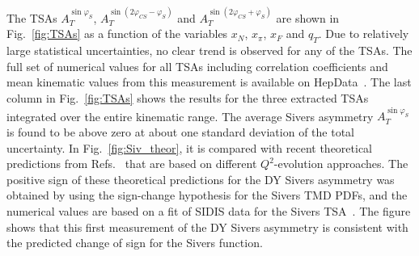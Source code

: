 \documentclass[a4paper,manyauthors,nocleardouble,COMPASS]{cernphprep}
\newcommand{\phiCS}{\varphi _{CS}}
\newcommand{\phiS}{\varphi _S}
\newcommand{\gvc}{GeV/$c$}
\newcommand{\gvcw}{GeV/$c^2$}
\begin{document}
The TSAs $A_T^{\sin\phiS}$, $A_T^{\sin(2\phiCS-\phiS)}$ and $A_T^{\sin(2\phiCS+\phiS)}$ are shown in Fig.~\ref{fig:TSAs} as a function of the variables $x_{N}$, $x_{\pi}$, $x_{F}$ and $q_{T}$.
Due to relatively large statistical uncertainties, no clear trend is observed for any of the TSAs.
The full set of numerical values for all TSAs including correlation coefficients and mean kinematic values from this measurement is available on HepData~\cite{hepdata}.
%
%
The last column in Fig.~\ref{fig:TSAs} shows the results for the three extracted TSAs integrated over the entire kinematic range.
The average Sivers asymmetry $A_T^{\sin\phiS}$ is found to be above zero at about one standard deviation of the total uncertainty. In Fig.~\ref{fig:Siv_theor}, it is compared with recent theoretical predictions from Refs.~\cite{Anselmino:2016uie,Echevarria:2014xaa,Sun:2013hua} that are based on different $Q^2$-evolution approaches. The positive sign of these theoretical predictions for the DY Sivers asymmetry was obtained by using the sign-change hypothesis for the Sivers TMD PDFs, and the numerical values are based on a fit of SIDIS data for the Sivers TSA~\cite{Airapetian:2009ae,Alekseev:2008aa, Adolph:2012sp}.
The figure shows that this first measurement of the DY Sivers asymmetry is consistent with the predicted change of sign for the Sivers function.
%
\end{document}
